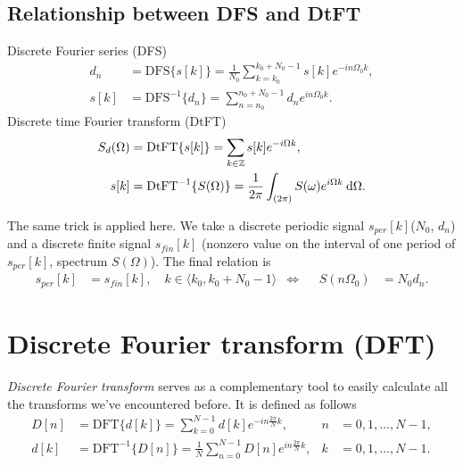 \documentclass[11pt,a4paper]{report}
\theoremstyle{remark}
\theoremstyle{definition}
\newcommand{\dft}[1]{\mathrm{DFT} \{ #1 \}}
\newcommand{\idft}[1]{\mathrm{DFT}^{-1} \{ #1 \}}
\newcommand{\dfs}[1]{\mathrm{DFS} \{ #1 \}}
\newcommand{\idfs}[1]{\mathrm{DFS}^{-1} \{ #1 \}}
\newcommand{\dtft}[1]{\mathrm{DtFT} \{ #1 \}}
\newcommand{\idtft}[1]{\mathrm{DtFT}^{-1} \{ #1 \}}
\begin{document}
			\subsection{Relationship between DFS and DtFT}
				
				\noindent
				Discrete Fourier series (DFS)
				\begin{align}
				d_n &= \dfs{s[k]} = \frac{1}{N_0} \sum_{k=k_0}^{k_0+N_0-1} s[k] e^{-in\Omega_0 k},
				\\
				s[k] &= \idfs{d_n} = \sum_{n=n_0}^{n_0+N_0-1} d_n e^{in\Omega_0 k}.
				\end{align}
				Discrete time Fourier transform (DtFT)
				\begin{align}
				S_d(\Omega) &= \dtft{s[k]} = \sum_{k \in \Z} s[k] e^{-i \Omega k},
				\\
				s[k] &= \idtft{S(\Omega)} = \frac{1}{2 \pi} \int_{(2 \pi)} S(\omega) e^{i \Omega k} \: \d \Omega.
				\end{align}
				
				The same trick is applied here. We take a discrete periodic signal $s_{per}[k]$($N_0$, $d_n$) and a discrete finite signal $s_{fin}[k]$ (nonzero value on the interval of one period of $s_{per}[k]$, spectrum $S(\Omega)$). The final relation is
				\begin{align}
					s_{per}[k] &= s_{fin}[k], \quad k \in \langle k_0, k_0 + N_0 -1 \rangle
				& \iff & &
					S(n \Omega_0) &= N_0 d_n.
				\end{align}
				
			
		\section{Discrete Fourier transform (DFT)}
			
			\textit{Discrete Fourier transform} serves as a complementary tool to easily calculate all the transforms we've encountered before. It is defined as follows
			\begin{align}
				\label{def:dft}
				D[n] &= \dft{d[k]} = \sum_{k=0}^{N-1} d[k] e^{-in \frac{2\pi}{N} k}, & n&=0,1,\dots,N-1,
			\\
				\label{def:idft}
				d[k] &= \idft{D[n]} = \frac 1N \sum_{n=0}^{N-1} D[n] e^{in \frac{2\pi}{N} k}, & k&=0,1,\dots,N-1.
			\end{align}
			
\end{document}
